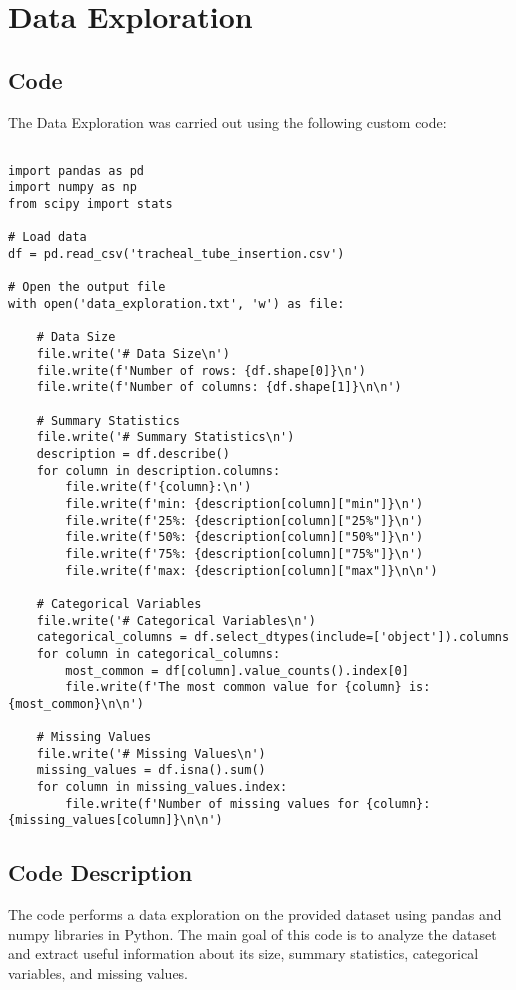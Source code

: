 \documentclass[11pt]{article}
\begin{document}
\section{Data Exploration}
\subsection{{Code}}
The Data Exploration was carried out using the following custom code:

\begin{verbatim}

import pandas as pd
import numpy as np
from scipy import stats

# Load data
df = pd.read_csv('tracheal_tube_insertion.csv')

# Open the output file
with open('data_exploration.txt', 'w') as file:

    # Data Size
    file.write('# Data Size\n')
    file.write(f'Number of rows: {df.shape[0]}\n')
    file.write(f'Number of columns: {df.shape[1]}\n\n')

    # Summary Statistics
    file.write('# Summary Statistics\n')
    description = df.describe()
    for column in description.columns:
        file.write(f'{column}:\n')
        file.write(f'min: {description[column]["min"]}\n')
        file.write(f'25%: {description[column]["25%"]}\n')
        file.write(f'50%: {description[column]["50%"]}\n')
        file.write(f'75%: {description[column]["75%"]}\n')
        file.write(f'max: {description[column]["max"]}\n\n')

    # Categorical Variables
    file.write('# Categorical Variables\n')
    categorical_columns = df.select_dtypes(include=['object']).columns
    for column in categorical_columns:
        most_common = df[column].value_counts().index[0]
        file.write(f'The most common value for {column} is: {most_common}\n\n')

    # Missing Values
    file.write('# Missing Values\n')
    missing_values = df.isna().sum()
    for column in missing_values.index:
        file.write(f'Number of missing values for {column}: {missing_values[column]}\n\n')

\end{verbatim}

\subsection{Code Description}

The code performs a data exploration on the provided dataset using pandas and numpy libraries in Python. The main goal of this code is to analyze the dataset and extract useful information about its size, summary statistics, categorical variables, and missing values.
\end{document}
